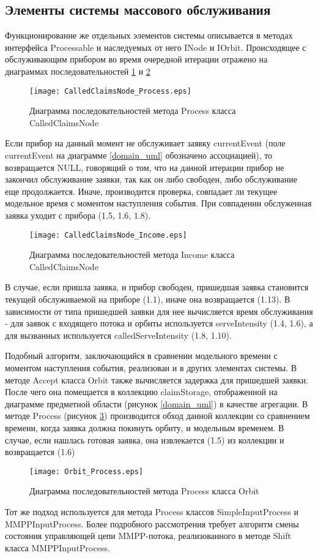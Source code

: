 \subsection{Элементы системы массового обслуживания}
Функционирование же отдельных элементов системы описывается в методах интерфейса Processable и наследуемых от него INode и IOrbit.
Происходящее с обслуживающим прибором во время очередной итерации отражено на диаграммах последовательностей \ref{CalledClaimsNode_Process_uml} и \ref{CalledClaimsNode_Income_uml}
\begin{figure}[H]
	\centering
	\texttt{[image: CalledClaimsNode\_Process.eps]}
	\caption{Диаграмма последовательностей метода Process класса CalledClaimsNode}
	\label{CalledClaimsNode_Process_uml}
\end{figure}
Если прибор на данный момент не обслуживает заявку currentEvent (поле currentEvent на диаграмме \ref{domain_uml} обозначено ассоциацией), то возвращается NULL, говорящий о том, что на данной итерации прибор не закончил обслуживание заявки, так как он либо свободен, либо обслуживание еще продолжается. Иначе, производится проверка, совпадает ли текущее модельное время с моментом наступления события. При совпадении обслуженная заявка уходит с прибора (1.5, 1.6, 1.8).
\begin{figure}[H]
	\centering
	\texttt{[image: CalledClaimsNode\_Income.eps]}
	\caption{Диаграмма последовательностей метода Income класса CalledClaimsNode}
	\label{CalledClaimsNode_Income_uml}
\end{figure}
В случае, если пришла заявка, и прибор свободен, пришедшая заявка становится текущей обслуживаемой на приборе (1.1), иначе она возвращается (1.13). В зависимости от типа пришедшей заявки для нее вычисляется время обслуживания - для заявок с входящего потока и орбиты используется serveIntensity (1.4, 1.6), а для  вызванных используется calledServeIntensity (1.8, 1.10).

Подобный алгоритм, заключающийся в сравнении модельного времени с моментом наступления события, реализован и в других элементах системы.
В методе Accept класса Orbit также вычисляется задержка для пришедшей заявки. После чего она помещается в коллекцию claimStorage, отображенной на диаграмме предметной области (рисунок \ref{domain_uml}) в качестве агрегации. В методе Process (рисунок \ref{Orbit_Process_uml}) производится обход данной коллекции со сравнением времени, когда заявка должна покинуть орбиту, и модельным временем. В случае, если нашлась готовая заявка, она извлекается (1.5) из коллекции и возвращается (1.6)
 \begin{figure}[H]
 	\centering
 	\texttt{[image: Orbit\_Process.eps]}
 	\caption{Диаграмма последовательностей метода Process класса Orbit}
 	\label{Orbit_Process_uml}
 \end{figure}
Тот же подход используется для метода Process классов SimpleInputProcess и \\ MMPPInputProcess. Более подробного рассмотрения требует алгоритм смены состояния управляющей цепи MMPP-потока, реализованного в методе Shift класса MMPPInputProcess.

